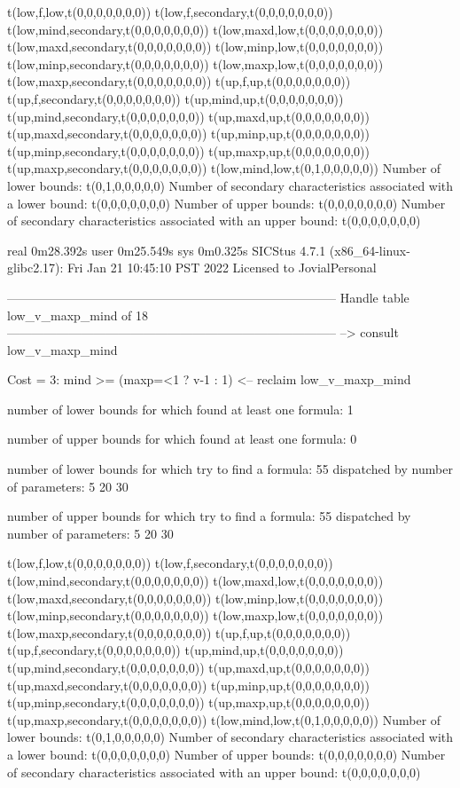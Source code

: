 t(low,f,low,t(0,0,0,0,0,0,0))
t(low,f,secondary,t(0,0,0,0,0,0,0))
t(low,mind,secondary,t(0,0,0,0,0,0,0))
t(low,maxd,low,t(0,0,0,0,0,0,0))
t(low,maxd,secondary,t(0,0,0,0,0,0,0))
t(low,minp,low,t(0,0,0,0,0,0,0))
t(low,minp,secondary,t(0,0,0,0,0,0,0))
t(low,maxp,low,t(0,0,0,0,0,0,0))
t(low,maxp,secondary,t(0,0,0,0,0,0,0))
t(up,f,up,t(0,0,0,0,0,0,0))
t(up,f,secondary,t(0,0,0,0,0,0,0))
t(up,mind,up,t(0,0,0,0,0,0,0))
t(up,mind,secondary,t(0,0,0,0,0,0,0))
t(up,maxd,up,t(0,0,0,0,0,0,0))
t(up,maxd,secondary,t(0,0,0,0,0,0,0))
t(up,minp,up,t(0,0,0,0,0,0,0))
t(up,minp,secondary,t(0,0,0,0,0,0,0))
t(up,maxp,up,t(0,0,0,0,0,0,0))
t(up,maxp,secondary,t(0,0,0,0,0,0,0))
t(low,mind,low,t(0,1,0,0,0,0,0))
Number of lower bounds:                                             t(0,1,0,0,0,0,0)
Number of secondary characteristics associated with a lower bound:  t(0,0,0,0,0,0,0)
Number of upper bounds:                                             t(0,0,0,0,0,0,0)
Number of secondary characteristics associated with an upper bound: t(0,0,0,0,0,0,0)

real	0m28.392s
user	0m25.549s
sys	0m0.325s
SICStus 4.7.1 (x86_64-linux-glibc2.17): Fri Jan 21 10:45:10 PST 2022
Licensed to JovialPersonal


--------------------------------------------------------------------------------
Handle table low_v_maxp_mind of 18
--------------------------------------------------------------------------------
--> consult low_v_maxp_mind

Cost =  3:  mind >= (maxp=<1 ? v-1 : 1)
<-- reclaim low_v_maxp_mind

number of lower bounds for which found at least one formula: 1

number of upper bounds for which found at least one formula: 0

number of lower bounds for which try to find a formula: 55
dispatched by number of parameters: 5  20  30

number of upper bounds for which try to find a formula: 55
dispatched by number of parameters: 5  20  30

t(low,f,low,t(0,0,0,0,0,0,0))
t(low,f,secondary,t(0,0,0,0,0,0,0))
t(low,mind,secondary,t(0,0,0,0,0,0,0))
t(low,maxd,low,t(0,0,0,0,0,0,0))
t(low,maxd,secondary,t(0,0,0,0,0,0,0))
t(low,minp,low,t(0,0,0,0,0,0,0))
t(low,minp,secondary,t(0,0,0,0,0,0,0))
t(low,maxp,low,t(0,0,0,0,0,0,0))
t(low,maxp,secondary,t(0,0,0,0,0,0,0))
t(up,f,up,t(0,0,0,0,0,0,0))
t(up,f,secondary,t(0,0,0,0,0,0,0))
t(up,mind,up,t(0,0,0,0,0,0,0))
t(up,mind,secondary,t(0,0,0,0,0,0,0))
t(up,maxd,up,t(0,0,0,0,0,0,0))
t(up,maxd,secondary,t(0,0,0,0,0,0,0))
t(up,minp,up,t(0,0,0,0,0,0,0))
t(up,minp,secondary,t(0,0,0,0,0,0,0))
t(up,maxp,up,t(0,0,0,0,0,0,0))
t(up,maxp,secondary,t(0,0,0,0,0,0,0))
t(low,mind,low,t(0,1,0,0,0,0,0))
Number of lower bounds:                                             t(0,1,0,0,0,0,0)
Number of secondary characteristics associated with a lower bound:  t(0,0,0,0,0,0,0)
Number of upper bounds:                                             t(0,0,0,0,0,0,0)
Number of secondary characteristics associated with an upper bound: t(0,0,0,0,0,0,0)

